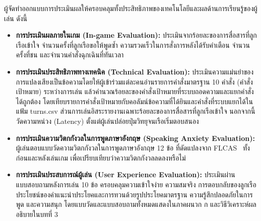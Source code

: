 ผู้จัดทำออกแบบการประเมินผลให้ครอบคลุมทั้งประสิทธิภาพของเทคโนโลยีและผลด้านการเรียนรู้ของผู้เล่น ดังนี้

\begin{itemize}
    \item \textbf{การประเมินผลภายในเกม (In-game Evaluation):} ประเมินจากร้อยละของการสื่อสารที่ลูกเรือเข้าใจ จำนวนครั้งที่ลูกเรือขอให้พูดซ้ำ ความรวดเร็วในการสั่งการหลังได้รับคำเตือน จำนวนครั้งที่ชน และจำนวนคำสั่งฉุกเฉินที่ทันเวลา
    \item \textbf{การประเมินประสิทธิภาพทางเทคนิค (Technical Evaluation):} ประเมินความแม่นยำของการแปลงเสียงเป็นข้อความโดยให้ผู้เข้าร่วมแต่ละคนอ่านรายการคำสั่งมาตรฐาน 10 คำสั่ง (คำสั่งเป้าหมาย) ระหว่างการเล่น แล้วคำนวณร้อยละของคำสั่งเป้าหมายที่ระบบถอดความและแยกคำสั่งได้ถูกต้อง โดยเทียบรายการคำสั่งเป้าหมายกับคอลัมน์ข้อความที่ได้ยินและคำสั่งที่ระบบแยกได้ในแฟ้ม turns.csv ส่วนการเล่นอิสระรายงานเฉพาะร้อยละของการสื่อสารที่ลูกเรือเข้าใจ นอกจากนี้วัดความหน่วง (Latency) ตั้งแต่ผู้เล่นปล่อยปุ่มวิทยุจนเรือเริ่มตอบสนอง
    \item \textbf{การประเมินความวิตกกังวลในการพูดภาษาอังกฤษ (Speaking Anxiety Evaluation):} ผู้เล่นตอบแบบวัดความวิตกกังวลในการพูดภาษาอังกฤษ 12 ข้อ ที่ดัดแปลงจาก FLCAS~\cite{horwitz1986} ทั้งก่อนและหลังเล่นเกม เพื่อเปรียบเทียบว่าความวิตกกังวลลดลงหรือไม่
    \item \textbf{การประเมินประสบการณ์ผู้เล่น (User Experience Evaluation):} ประเมินผ่านแบบสอบถามหลังการเล่น 10 ข้อ ครอบคลุมความเข้าใจง่าย ความสมจริง การตอบกลับของลูกเรือ ประโยชน์ของคำแนะนำประโยคและการทวนด้วยรูปประโยคมาตรฐาน ความรู้สึกปลอดภัยในการพูด และความสนุก โดยแบบวัดและแบบสอบถามทั้งหมดแสดงในภาคผนวก ก และวิธีวิเคราะห์ผลอธิบายในบทที่ 3
\end{itemize}